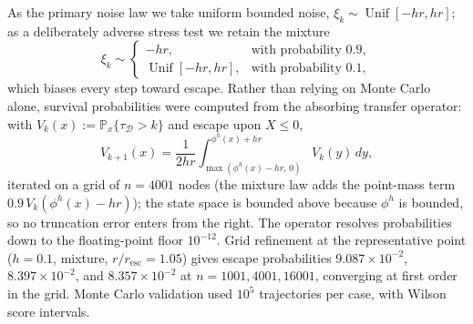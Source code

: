 \documentclass[pdflatex,sn-mathphys-num]{sn-jnl}
\numberwithin{equation}{section}
\theoremstyle{thmstyleone}%
\theoremstyle{definition}
\theoremstyle{remark}
\begin{document}
As the primary noise law we take uniform bounded noise, \(\xi_k\sim\operatorname{Unif}[-hr,hr]\); as a deliberately adverse stress test we retain the mixture
\begin{equation}
    \xi_k
    \sim
    \begin{cases}
        -hr, & \text{with probability }0.9,\\
        \operatorname{Unif}[-hr,hr],
            & \text{with probability }0.1,
    \end{cases}
    \label{eq:stress-test-noise-law}
\end{equation}
which biases every step toward escape.  Rather than relying on Monte Carlo alone, survival probabilities were computed from the absorbing transfer operator: with \(V_k(x):=\mathbb P_x\{\tau_{\mathcal D}>k\}\) and escape upon \(X\leq0\),
\[
    V_{k+1}(x)
    =
    \frac{1}{2hr}
    \int_{\max(\phi^h(x)-hr,\,0)}^{\phi^h(x)+hr}
    V_k(y)\,dy,
\]
iterated on a grid of \(n=4001\) nodes (the mixture law adds the point-mass term \(0.9\,V_k(\phi^h(x)-hr)\)); the state space is bounded above because \(\phi^h\) is bounded, so no truncation error enters from the right.  The operator resolves probabilities down to the floating-point floor \(10^{-12}\).  Grid refinement at the representative point (\(h=0.1\), mixture, \(r/r_{\mathrm{esc}}=1.05\)) gives escape probabilities \(9.087\times10^{-2}\), \(8.397\times10^{-2}\), and \(8.357\times10^{-2}\) at \(n=1001,4001,16001\), converging at first order in the grid.  Monte Carlo validation used \(10^5\) trajectories per case, with Wilson score intervals.
\end{document}

